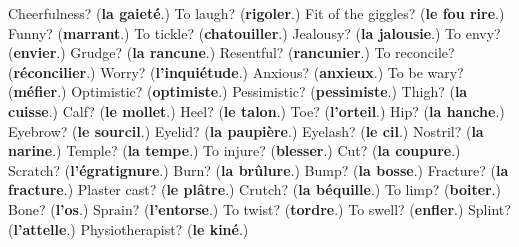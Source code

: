 \begin{tcolorbox}[breakable,colback=teal!4,colframe=teal!35!black,title={Before you move on}]
Cheerfulness? (\textbf{la gaieté}.) To laugh? (\textbf{rigoler}.) Fit of the giggles? (\textbf{le fou rire}.) Funny? (\textbf{marrant}.) To tickle? (\textbf{chatouiller}.) Jealousy? (\textbf{la jalousie}.) To envy? (\textbf{envier}.) Grudge? (\textbf{la rancune}.) Resentful? (\textbf{rancunier}.) To reconcile? (\textbf{réconcilier}.) Worry? (\textbf{l'inquiétude}.) Anxious? (\textbf{anxieux}.) To be wary? (\textbf{méfier}.) Optimistic? (\textbf{optimiste}.) Pessimistic? (\textbf{pessimiste}.) Thigh? (\textbf{la cuisse}.) Calf? (\textbf{le mollet}.) Heel? (\textbf{le talon}.) Toe? (\textbf{l'orteil}.) Hip? (\textbf{la hanche}.) Eyebrow? (\textbf{le sourcil}.) Eyelid? (\textbf{la paupière}.) Eyelash? (\textbf{le cil}.) Nostril? (\textbf{la narine}.) Temple? (\textbf{la tempe}.) To injure? (\textbf{blesser}.) Cut? (\textbf{la coupure}.) Scratch? (\textbf{l'égratignure}.) Burn? (\textbf{la brûlure}.) Bump? (\textbf{la bosse}.) Fracture? (\textbf{la fracture}.) Plaster cast? (\textbf{le plâtre}.) Crutch? (\textbf{la béquille}.) To limp? (\textbf{boiter}.) Bone? (\textbf{l'os}.) Sprain? (\textbf{l'entorse}.) To twist? (\textbf{tordre}.) To swell? (\textbf{enfler}.) Splint? (\textbf{l'attelle}.) Physiotherapist? (\textbf{le kiné}.)
\end{tcolorbox}
